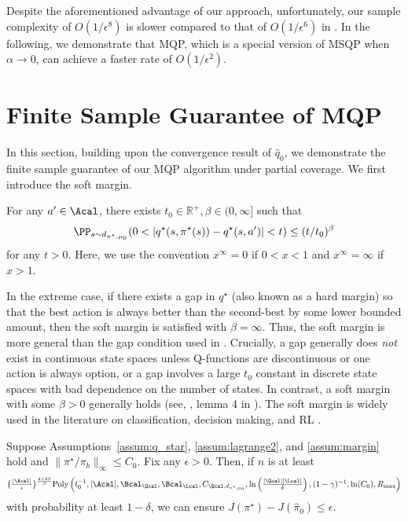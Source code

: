{\finaledit Despite the aforementioned advantage of our approach, unfortunately, our sample complexity of $O(1/\epsilon^8)$ is slower compared to that of $O(1/\epsilon^6)$ in \citet{zhan2022offline}. In the following, we demonstrate that MQP, which is a special version of MSQP when $\alpha \to 0$, can achieve a faster rate of $O(1/\epsilon^2)$.}


\section{Finite Sample Guarantee of MQP} \label{sec:margin}


In this section, building upon the convergence result of $\hat q_0$, we demonstrate the finite sample guarantee of our MQP algorithm under partial coverage. We first introduce the soft margin.

\begin{assum}\label{assum:margin}
For any $a'\in \Acal$, there exists $t_0 \in \mathbb{R}^{+},\beta \in (0,\infty]$ such that 
\begin{align*}
    \PP_{s \sim d_{{\pi^{\star},\mu_0}}}(0<|q^{\star}(s,\pi^{\star}(s))-q^{\star}(s,a')|<t)\leq (t/t_0)^{\beta} 
\end{align*}
for any $t>0$. Here, we use the convention $x^{\infty}=0$ if $0<x<1$ and $x^{\infty}=\infty$ if $x>1$. 
\end{assum}

In the extreme case, if there exists a gap in $q^{\star}$ (also known as a hard margin) so that the best action is always better than the second-best by some lower bounded amount, then the soft margin is satisfied with $\beta=\infty$. Thus, the soft margin is more general than the gap condition  used in \citet{simchowitz2019non,wu2022gap}.
Crucially, a gap generally does \textit{not} exist in continuous state spaces unless Q-functions are discontinuous or one action is always option, or a gap involves a large $t_0$ constant in discrete state spaces with bad dependence on the number of states. In contrast, a soft margin with some $\beta>0$ generally holds (see, \eg, lemma 4 in \citealp{hu2021fast}). The soft margin is widely used in the literature on classification, decision making, and RL \citep{audibert2007fast,perchet2013multi,luedtke2020performance,hu2021fast,hu2022fast}.






\begin{theorem}\label{thm:pac_q_function}
Suppose Assumptions~\ref{assum:q_star}, \ref{assum:lagrange2}, and \ref{assum:margin} hold and  $\|\pi^{\star}/\pi_b\|_{\infty}\leq C_0$. 
 Fix any $\epsilon>0$. Then, if $n$ is at least 
\begin{align*}
\textstyle
\{\frac{|\Acal|}{\epsilon}\}^{\frac{4+2\beta}{\beta}} \mathrm{Poly}\left(t^{-1}_0,|\Acal|,\Bcal_{\Qcal},\Bcal_{\Lcal},C_{\Qcal,d_{\pi^{\star},\mu_0} }, \ln\left (\frac{|\Qcal||\Lcal|}{\delta}\right) %
,(1-\gamma)^{-1},\ln(C_0),R_{\max} \right)%
\end{align*}
with probability at least $1-\delta$, we can ensure $ J(\pi^{\star})-J(\hat \pi_{0})\leq \epsilon$. 
\end{theorem}

